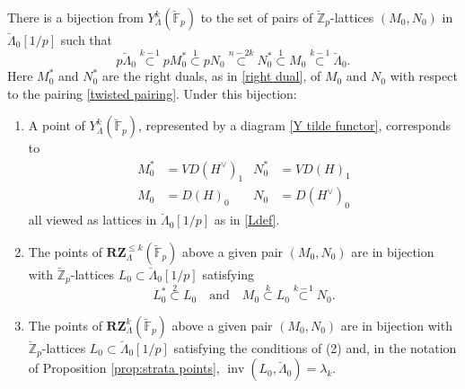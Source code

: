 \documentclass[11pt]{alggeom}
\newcommand{\Z}{\mathbb Z}
\newcommand{\F}{\mathbb F}
\DeclareMathOperator{\inv}{inv}
\begin{document}
\begin{proposition}\label{prop:RZ tilde points}
There is a   bijection from $Y^k_\Lambda(\breve{\F}_p)$ to the set of pairs of $\breve{\Z}_p$-lattices $(M_0,N_0)$ in $\breve{\Lambda}_0[1/p]$ 
such that
\[
 p\breve{\Lambda}_0 \stackrel{k-1}{\subset}  p M_0^* \stackrel{1}{\subset}  pN_0 \stackrel{n-2k}{\subset}  N_0^* \stackrel{1}{\subset}  M_0 \stackrel{k-1}{\subset} \breve{\Lambda}_0  .
 \]
Here  $M_0^*$ and $N_0^*$ are the right duals, as in \eqref{right dual}, of $M_0$ and $N_0$ with respect to the pairing \eqref{twisted pairing}.
 Under this bijection:
 \begin{enumerate}
 \item
 A point of $Y_\Lambda^k(\breve{\F}_p)$, represented by a diagram \eqref{Y tilde functor}, corresponds to 
 \begin{align*}
 M_0^* &= VD(H^\vee)_1  & N_0^*&= VD(H)_1   \\
   M_0 &= D(H)_0   &     N_0 &= D(H^\vee)_0
 \end{align*}
 all viewed as lattices in $\breve{\Lambda}_0[1/p]$ as in \eqref{Ldef}.
 
 \item
The points of $\mathbf{RZ}^{\le k}_\Lambda(\breve{\F}_p)$ above a given pair $(M_0,N_0)$ are in bijection with $\breve{\Z}_p$-lattices $ L_0 \subset \breve{\Lambda}_0[1/p]$ satisfying
 \[
 L_0^* \stackrel{2}{\subset} L_0\quad \mbox{and}\quad   M_0 \stackrel{k}{\subset} L_0 \stackrel{k-1}{\subset} N_0. 
 \]
 \item
 The points of $\mathbf{RZ}^k_\Lambda(\breve{\F}_p)$ above a given pair $(M_0,N_0)$ are in bijection with $\breve{\Z}_p$-lattices $ L_0 \subset \breve{\Lambda}_0[1/p]$ satisfying the conditions of (2) and, in the notation of  Proposition  \ref{prop:strata points},  $\inv(L_0 , \breve{\Lambda}_0) = \lambda_k$.
 \end{enumerate}
\end{proposition}
\end{document}

